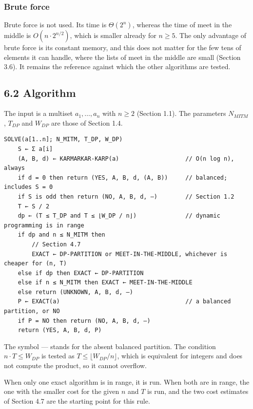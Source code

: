 \documentclass[
]{article}
\begin{document}
\hypertarget{brute-force-1}{%
\subsubsection{Brute force}\label{brute-force-1}}

Brute force is not used. Its time is \(\Theta(2^n)\), whereas the time
of meet in the middle is \(O(n \cdot 2^{n/2})\), which is smaller
already for \(n \ge 5\). The only advantage of brute force is its
constant memory, and this does not matter for the few tens of elements
it can handle, where the lists of meet in the middle are small (Section
3.6). It remains the reference against which the other algorithms are
tested.

\hypertarget{algorithm-4}{%
\subsection{6.2 Algorithm}\label{algorithm-4}}

The input is a multiset \(a_1, \dots, a_n\) with \(n \ge 2\) (Section
1.1). The parameters \(N_{MITM}\), \(T_{DP}\) and \(W_{DP}\) are those
of Section 1.4.

\begin{verbatim}
SOLVE(a[1..n]; N_MITM, T_DP, W_DP)
    S ← Σ a[i]
    (A, B, d) ← KARMARKAR-KARP(a)                   // O(n log n), always
    if d = 0 then return (YES, A, B, d, (A, B))     // balanced; includes S = 0
    if S is odd then return (NO, A, B, d, —)        // Section 1.2
    T ← S / 2
    dp ← (T ≤ T_DP and T ≤ ⌊W_DP / n⌋)              // dynamic programming is in range
    if dp and n ≤ N_MITM then
        // Section 4.7
        EXACT ← DP-PARTITION or MEET-IN-THE-MIDDLE, whichever is cheaper for (n, T)
    else if dp then EXACT ← DP-PARTITION
    else if n ≤ N_MITM then EXACT ← MEET-IN-THE-MIDDLE
    else return (UNKNOWN, A, B, d, —)
    P ← EXACT(a)                                    // a balanced partition, or NO
    if P = NO then return (NO, A, B, d, —)
    return (YES, A, B, d, P)
\end{verbatim}

The symbol --- stands for the absent balanced partition. The condition
\(n \cdot T \le W_{DP}\) is tested as
\(T \le \lfloor W_{DP} / n \rfloor\), which is equivalent for integers
and does not compute the product, so it cannot overflow.

When only one exact algorithm is in range, it is run. When both are in
range, the one with the smaller cost for the given \(n\) and \(T\) is
run, and the two cost estimates of Section 4.7 are the starting point
for this rule.
\end{document}
